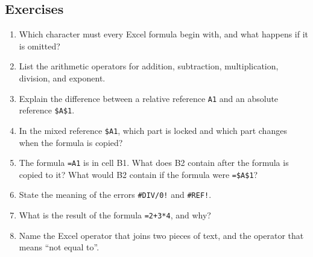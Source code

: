 \documentclass[11pt]{article}
\begin{document}
\subsection*{Exercises}
\begin{enumerate}[label=\arabic*.]
  \item Which character must every Excel formula begin with, and what happens
    if it is omitted?
  \item List the arithmetic operators for addition, subtraction,
    multiplication, division, and exponent.
  \item Explain the difference between a relative reference \texttt{A1} and an
    absolute reference \texttt{\$A\$1}.
  \item In the mixed reference \texttt{\$A1}, which part is locked and which
    part changes when the formula is copied?
  \item The formula \texttt{=A1} is in cell B1. What does B2 contain after the
    formula is copied to it? What would B2 contain if the formula were
    \texttt{=\$A\$1}?
  \item State the meaning of the errors \texttt{\#DIV/0!} and
    \texttt{\#REF!}.
  \item What is the result of the formula \texttt{=2+3*4}, and why?
  \item Name the Excel operator that joins two pieces of text, and the operator
    that means ``not equal to''.
\end{enumerate}
\end{document}
